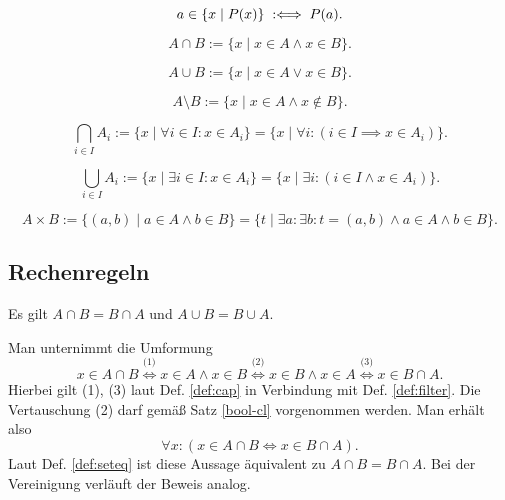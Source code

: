 \begin{Definition}\label{def:filter}
\[a\in\{x\mid P(x)\} \;:\Longleftrightarrow\; P(a).\]
\end{Definition}

\begin{Definition}[Schnittmenge]%
\label{def:cap}
\[A\cap B := \{x\mid x\in A\land x\in B\}.\]
\end{Definition}

\begin{Definition}[Vereinigungsmenge]%
\label{def:cup}
\[A\cup B := \{x\mid x\in A\lor x\in B\}.\]
\end{Definition}

\begin{Definition}[Differenzmenge]%
\label{def:set-diff}
\[A\setminus B := \{x\mid x\in A\land x\notin B\}.\]
\end{Definition}

\begin{Definition}[Schnittmenge]\label{def:intersection}
\[\bigcap_{i\in I} A_i := \{x\mid \forall i{\in}I\colon x\in A_i\}
= \{x\mid \forall i\colon (i\in I\implies x\in A_i)\}.\]
\end{Definition}

\begin{Definition}[Vereinigungsmenge]\label{def:union}
\[\bigcup_{i\in I} A_i := \{x\mid \exists i{\in}I\colon x\in A_i\}
= \{x\mid \exists i\colon (i\in I\land x\in A_i)\}.\]
\end{Definition}

\begin{Definition}%
\label{def:cart}
\[A\times B := \{(a,b)\mid a\in A\land b\in B\}
= \{t\mid\exists a\colon\exists b\colon t=(a,b)\land a\in A\land b\in B\}.\]
\end{Definition}

\subsection{Rechenregeln}

\begin{Satz}[Kommutativgesetze]
Es gilt $A\cap B = B\cap A$ und $A\cup B = B\cup A$.
\end{Satz}

\begin{Beweis}
Man unternimmt die Umformung
\[x\in A\cap B
\stackrel{\text{(1)}}{\iff} x\in A\land x\in B
\stackrel{\text{(2)}}{\iff} x\in B\land x\in A
\stackrel{\text{(3)}}{\iff} x\in B\cap A.\]
Hierbei gilt (1), (3) laut Def. \ref{def:cap} in Verbindung mit
Def. \ref{def:filter}. Die Vertauschung (2) darf gemäß Satz \ref{bool-cl}
vorgenommen werden. Man erhält also
\[\forall x\colon (x\in A\cap B \iff x\in B\cap A).\]
Laut Def. \ref{def:seteq} ist diese Aussage äquivalent zu
$A\cap B = B\cap A$.
Bei der Vereinigung verläuft der Beweis analog.\,\qedsymbol
\end{Beweis}


